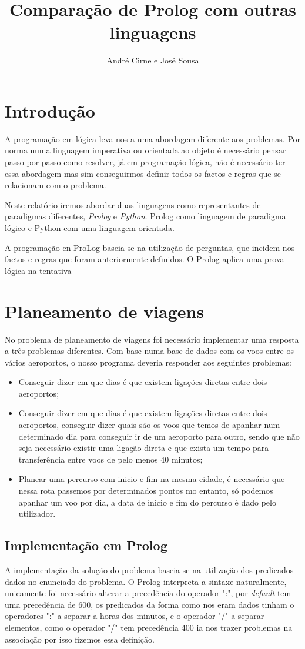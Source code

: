 \documentclass[12pt,a4paper]{report}
\author{André Cirne e José Sousa}
\title{Comparação de Prolog com outras linguagens}
\begin{document}
\maketitle
\tableofcontents
\section{Introdução}
A programação em lógica leva-nos a uma abordagem diferente aos problemas. Por norma numa linguagem imperativa ou orientada ao objeto é necessário pensar passo por passo como resolver, já em programação lógica, não é necessário ter essa abordagem mas sim conseguirmos definir todos os factos e regras que se relacionam com o problema.

Neste relatório iremos abordar duas linguagens como representantes de paradigmas diferentes, \textit{Prolog} e \textit{Python}. Prolog como linguagem de paradigma lógico e Python com uma linguagem orientada.

A programação en ProLog baseia-se na utilização de perguntas, que incidem nos factos e regras que foram anteriormente definidos. O Prolog aplica uma prova lógica na tentativa
\section{Planeamento de viagens}
No problema de planeamento de viagens foi necessário implementar uma resposta a três problemas diferentes. Com base numa base de dados com os voos entre os vários aeroportos, o nosso programa deveria responder aos seguintes problemas: 
\begin{itemize}
 \item Conseguir dizer em que dias é que existem ligações diretas entre dois aeroportos;
 \item Conseguir dizer em que dias é que existem ligações diretas entre dois aeroportos, conseguir dizer quais são os voos que temos de apanhar num determinado dia para conseguir ir de um aeroporto para outro, sendo que não seja necessário existir uma ligação direta e que exista um tempo para transferência entre voos de pelo menos 40 minutos;
 \item Planear uma percurso com inicio e fim na mesma cidade, é necessário que nessa rota passemos por determinados pontos mo entanto, só podemos apanhar um voo por dia, a data de inicio e fim do percurso é dado pelo utilizador.   
\end{itemize}

\subsection{Implementação em Prolog}
A implementação da solução do problema baseia-se na utilização dos predicados dados no enunciado do problema. O Prolog interpreta a sintaxe naturalmente, unicamente foi necessário alterar a precedência do operador ":", por \textit{default} tem uma precedência de 600, os predicados da forma como nos eram dados tinham o operadores ":" a separar a horas dos minutos, e o operador "/" a separar elementos, como o operador "/" tem precedência 400 ia nos trazer problemas na associação por isso fizemos essa definição.
\end{document}
